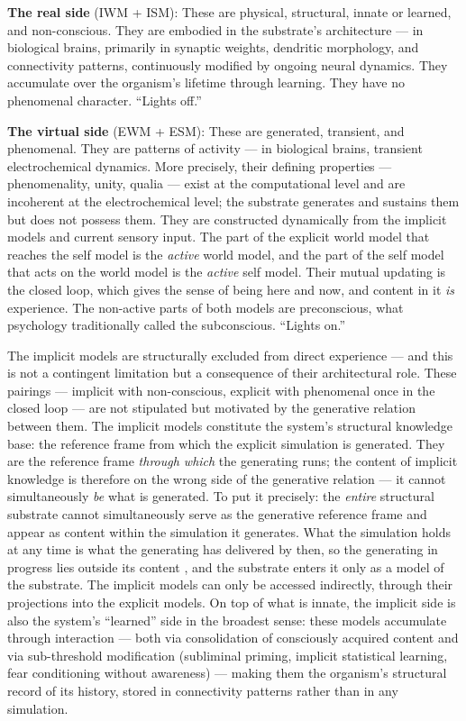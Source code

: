 \documentclass[12pt]{article}
\newcommand{\rev}[1]{#1}
\begin{document}
\textbf{The real side} (IWM + ISM): These are physical, structural, innate or learned, and non-conscious. They are \rev{embodied} in the substrate's architecture --- in biological brains, primarily in synaptic weights, dendritic morphology, and connectivity patterns, \rev{continuously modified by ongoing neural dynamics}. They accumulate over the organism's lifetime through learning. They have no phenomenal character. ``Lights off.''

\textbf{The virtual side} (EWM + ESM): These are generated, transient, and phenomenal. They are patterns of activity --- in biological brains, transient electrochemical dynamics. More precisely, their defining properties --- phenomenality, unity, qualia --- exist at the computational level and are incoherent at the electrochemical level; the substrate generates and sustains them but does not possess them. They are constructed dynamically from the implicit models and current sensory input. The part of the explicit world model that reaches the self model is the \emph{active} world model, and the part of the self model that acts on the world model is the \emph{active} self model. Their mutual updating is the closed loop, which gives the sense of being here and now, and content in it \emph{is} experience. The non-active parts of both models are preconscious, what psychology traditionally called the subconscious. ``Lights on.''

The implicit models are structurally excluded from direct experience --- and this is not a contingent limitation but a consequence of their architectural role. These pairings --- implicit with non-conscious, explicit with phenomenal once in the closed loop --- are not stipulated but motivated by the generative relation between them. The implicit models constitute the system's structural knowledge base: the reference frame from which the explicit simulation is generated. They are the reference frame \emph{through which} the generating runs; the content of implicit knowledge is therefore on the wrong side of the generative relation --- it cannot simultaneously \emph{be} what is generated. To put it precisely: the \emph{entire} structural substrate cannot simultaneously serve as the generative reference frame and appear as content within the simulation it generates. What the simulation holds at any time is what the generating has delivered by then, so the generating in progress lies outside its content \citep{Gruber2026h}, and the substrate enters it only as a model of the substrate. The implicit models can only be accessed indirectly, through their projections into the explicit models. On top of what is innate, the implicit side is also the system's ``learned'' side in the broadest sense: these models accumulate through interaction --- both via consolidation of consciously acquired content and via sub-threshold modification (subliminal priming, implicit statistical learning, fear conditioning without awareness) --- making them the organism's structural record of its history, stored in connectivity patterns rather than in any simulation.
\end{document}

